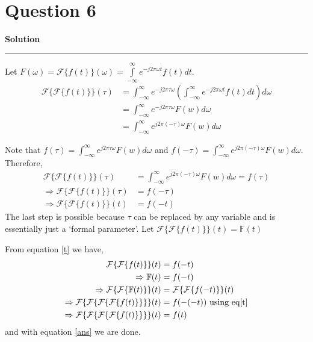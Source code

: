 \documentclass[a4paper,12pt]{article}
\title{\cooltitle{CS663 Assignment-3}}
\author{{\bf Saksham Rathi, Kavya Gupta, Shravan Srinivasa Raghavan} \\
\small Department of Computer Science, \\
Indian Institute of Technology Bombay \\}
\date{}
\newenvironment{solution}[2][]{%
    \begin{mdframed}[linecolor=green!60!black, linewidth=2pt, roundcorner=10pt, backgroundcolor=green!5!white, skipabove=12pt, skipbelow=12pt]%
        \textbf{\large #2} %
        \par\noindent\rule{\textwidth}{0.4pt} %
        \vspace{0.5em} %
}{%
    \end{mdframed}%
}
\begin{document}
\maketitle
\section*{Question 6}

\begin{solution}{Solution}
    Let $F(\omega) = \mathcal{F} \{f(t)\}(\omega) = \int\limits_{-\infty}^{\infty} e^{-j2\pi\omega t} f(t)dt$.
    \begin{align*}
        \mathcal{F}\{\mathcal{F}\{f(t)\}\}(\tau) 
        &= \int_{-\infty}^{\infty} e^{-j2\pi\tau\omega} 
        \left( \int_{-\infty}^{\infty} e^{-j2\pi\omega t}f(t) dt \right) d\omega \\
        &= \int_{-\infty}^{\infty} e^{-j2\pi\tau\omega} F(w) d\omega \\
        &= \int_{-\infty}^{\infty} e^{j2\pi(-\tau)\omega} F(w) d\omega
    \end{align*}

    Note that $f(\tau) = \int_{-\infty}^{\infty} e^{j2\pi\tau\omega} F(w) d\omega$ and 
    $f(-\tau) = \int_{-\infty}^{\infty} e^{j2\pi(-\tau)\omega} F(w) d\omega$. Therefore,
    \begin{align}
      \mathcal{F}\{\mathcal{F}\{f(t)\}\}(\tau) &= \int_{-\infty}^{\infty} e^{j2\pi(-\tau)\omega} F(w) d\omega = f(\tau) \nonumber \\
      \Rightarrow \mathcal{F}\{\mathcal{F}\{f(t)\}\}(\tau) &= f(-\tau) \nonumber \\
      \label{t}\Rightarrow \mathcal{F}\{\mathcal{F}\{f(t)\}\}(t) &= f(-t) 
    \end{align}
    The last step is possible because $\tau$ can be replaced by any variable and is essentially just a `formal parameter'. Let
    $\mathcal{F}\{\mathcal{F}\{f(t)\}\}(t) = \mathbb{F}(t)$
    
    From equation \ref{t} we have,
    \begin{align}
      \mathcal{F}\{\mathcal{F}\{f(t)\}\}(t) &= f(-t) \nonumber \\
      \Rightarrow \mathbb{F}(t) &= f(-t) \nonumber \\
      \Rightarrow \mathcal{F}\{\mathcal{F}\{\mathbb{F}(t)\}\}(t) &= \mathcal{F}\{\mathcal{F}\{f(-t)\}\}(t) \nonumber \\
      \Rightarrow \mathcal{F}\{\mathcal{F}\{\mathcal{F}\{\mathcal{F}\{f(t)\}\}\}\}(t) &= f(-(-t)) \text{ using eq\ref{t}}\nonumber \\
      \Rightarrow \label{ans}\mathcal{F}\{\mathcal{F}\{\mathcal{F}\{\mathcal{F}\{f(t)\}\}\}\}(t) &= f(t)
    \end{align}
    and with equation \ref{ans} we are done.
\end{solution}
\end{document}
